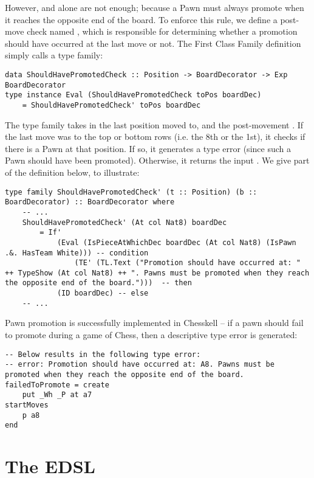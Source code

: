 However,  and  alone are not enough; because a Pawn must always promote when it reaches the opposite end of the board. To enforce this rule, we define a post-move check named , which is responsible for determining whether a promotion should have occurred at the last move or not. The First Class Family definition simply calls a type family:

\begin{lstlisting}
data ShouldHavePromotedCheck :: Position -> BoardDecorator -> Exp BoardDecorator
type instance Eval (ShouldHavePromotedCheck toPos boardDec)
    = ShouldHavePromotedCheck' toPos boardDec
\end{lstlisting}

The  type family takes in the last position moved to, and the post-movement . If the last move was to the top or bottom rows (i.e. the 8th or the 1st), it checks if there is a Pawn at that position. If so, it generates a type error (since such a Pawn should have been promoted). Otherwise, it returns the input . We give part of the definition below, to illustrate:

\begin{lstlisting}
type family ShouldHavePromotedCheck' (t :: Position) (b :: BoardDecorator) :: BoardDecorator where
    -- ...
    ShouldHavePromotedCheck' (At col Nat8) boardDec
        = If'
            (Eval (IsPieceAtWhichDec boardDec (At col Nat8) (IsPawn .&. HasTeam White))) -- condition
                (TE' (TL.Text ("Promotion should have occurred at: " ++ TypeShow (At col Nat8) ++ ". Pawns must be promoted when they reach the opposite end of the board.")))  -- then
            (ID boardDec) -- else
    -- ...
\end{lstlisting}

Pawn promotion is successfully implemented in Chesskell -- if a pawn should fail to promote during a game of Chess, then a descriptive type error is generated:

\begin{lstlisting}
-- Below results in the following type error:
-- error: Promotion should have occurred at: A8. Pawns must be promoted when they reach the opposite end of the board.
failedToPromote = create
    put _Wh _P at a7
startMoves
    p a8
end
\end{lstlisting}

\section{The EDSL}

